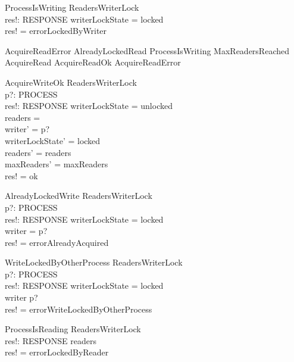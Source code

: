 \documentclass{article}
\begin{document}
\begin{schema}{ProcessIsWriting}
    \Xi ReadersWriterLock \\
    res!: RESPONSE
\where
    writerLockState = locked \\
    res! = errorLockedByWriter
\end{schema}

\begin{zed}
AcquireReadError  AlreadyLockedRead \lor ProcessIsWriting \lor MaxReadersReached  
\also
AcquireRead  AcquireReadOk \lor AcquireReadError 
\end{zed}

\begin{schema}{AcquireWriteOk}
    \Delta ReadersWriterLock \\
    p?: PROCESS \\
    res!: RESPONSE
\where
    writerLockState = unlocked \\
    readers = \emptyset \\
    writer' = p? \\
    writerLockState' = locked \\
    readers' = readers \\
    maxReaders' = maxReaders \\
    res! = ok
\end{schema}

\begin{schema}{AlreadyLockedWrite}
    \Xi ReadersWriterLock \\
    p?: PROCESS \\
    res!: RESPONSE
\where
    writerLockState = locked \\
    writer = p? \\
    res! = errorAlreadyAcquired
\end{schema}

\begin{schema}{WriteLockedByOtherProcess}
    \Xi ReadersWriterLock \\
    p?: PROCESS \\
    res!: RESPONSE
\where
    writerLockState = locked \\
    writer \neq p? \\
    res! = errorWriteLockedByOtherProcess
\end{schema}

\begin{schema}{ProcessIsReading}
    \Xi ReadersWriterLock \\
    res!: RESPONSE
\where
    readers \neq \emptyset \\
    res! = errorLockedByReader
\end{schema}
\end{document}
